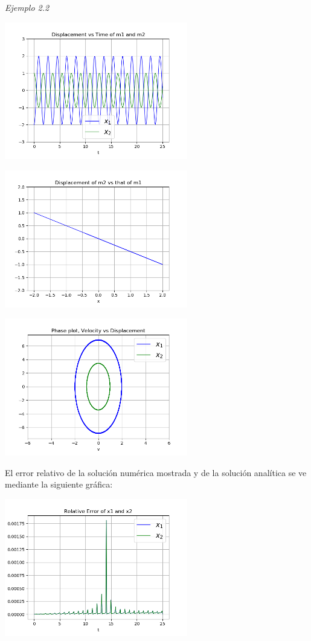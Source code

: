 \documentclass[a4paper]{article}
\begin{document}
\textit{Ejemplo 2.2}

\begin{center}
\includegraphics[height=6cm]{ejemplo2-2.png}

\includegraphics[height=6cm]{recta2-2.png}

\includegraphics[height=6cm]{circulo2-2.png}
\end{center}

El error relativo de la solución numérica mostrada y de la solución analítica se ve mediante la siguiente gráfica:

\begin{center}
\includegraphics[height=6cm]{error2-2.png}
\end{center}
\end{document}
